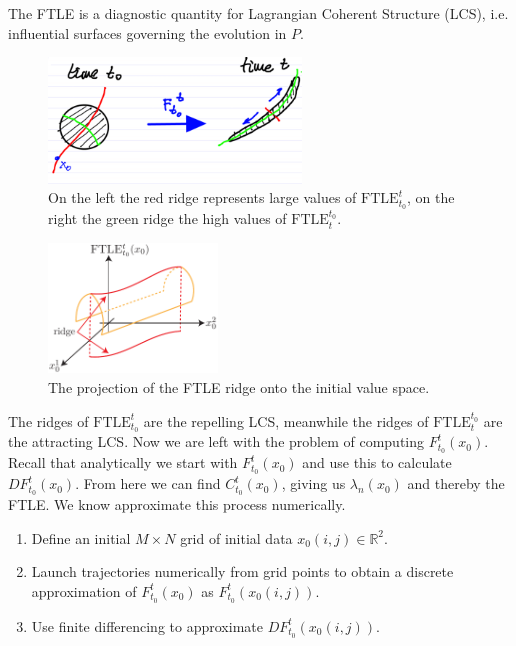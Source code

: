 The FTLE is a diagnostic quantity for Lagrangian Coherent Structure (LCS), i.e. influential surfaces governing the evolution in $P$.
\begin{figure}[h]
	\centering
	\includegraphics[width=0.6\textwidth]{figures/ch1/9deformation.png}
	\caption{On the left the red ridge represents large values of $ \textrm{FTLE} _{t_0}^{t}$, on the right the green ridge the high values of $ \textrm{FTLE} _{t}^{t_0}$.}
\end{figure}
\begin{figure}[h]
	\centering
	\includegraphics[width=0.4\textwidth]{figures/ch1/10ridge_projection}
	\caption{The projection of the FTLE ridge onto the initial value space.}
\end{figure}

The ridges of $ \textrm{FTLE} _{t_0}^{t}$ are the repelling LCS, meanwhile the ridges of $ \textrm{FTLE} _{t}^{t_0}$ are the attracting LCS. Now we are left with the problem of computing $F_{t_0}^{t}(x_0)$. Recall that analytically we start with $F_{t_0}^{t}(x_0)$ and use this to calculate $DF_{t_0}^{t}(x_0)$. From here we can find $C_{t_0}^{t}(x_0)$, giving us $\lambda_n(x_0)$ and thereby the FTLE. We know approximate this process numerically.
\begin{enumerate}
	\item Define an initial $M\times N$ grid of initial data $x_0(i,j) \in \mathbb{R}^2$.
	\item Launch trajectories numerically from grid points to obtain a discrete approximation of $F_{t_0}^{t}(x_0)$ as $F_{t_0}^{t}(x_0(i,j))$.
	\item Use finite differencing to approximate $DF_{t_0}^{t}(x_0(i,j)).$
\end{enumerate}

